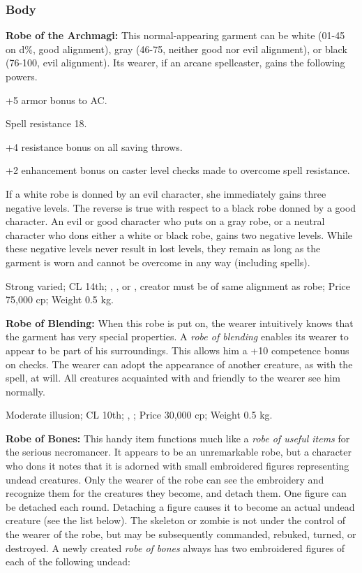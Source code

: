 \subsubsection{Body}

\textbf{Robe of the Archmagi:} This normal-appearing garment can be white (01-45 on d\%, good alignment), gray (46-75, neither good nor evil alignment), or black (76-100, evil alignment). Its wearer, if an arcane spellcaster, gains the following powers.

\begin{itemize*}
\item +5 armor bonus to AC.
\item Spell resistance 18.
\item +4 resistance bonus on all saving throws.
\item +2 enhancement bonus on caster level checks made to overcome spell resistance.
\end{itemize*}

If a white robe is donned by an evil character, she immediately gains three negative levels. The reverse is true with respect to a black robe donned by a good character. An evil or good character who puts on a gray robe, or a neutral character who dons either a white or black robe, gains two negative levels. While these negative levels never result in lost levels, they remain as long as the garment is worn and cannot be overcome in any way (including  spells).

Strong varied; CL 14th; , ,  or , creator must be of same alignment as robe; Price 75,000 cp; Weight 0.5 kg.

\textbf{Robe of Blending:} When this robe is put on, the wearer intuitively knows that the garment has very special properties. A \emph{robe of blending} enables its wearer to appear to be part of his surroundings. This allows him a +10 competence bonus on  checks. The wearer can adopt the appearance of another creature, as with the  spell, at will. All creatures acquainted with and friendly to the wearer see him normally.

Moderate illusion; CL 10th; , ; Price 30,000 cp; Weight 0.5 kg.

\textbf{Robe of Bones:} This handy item functions much like a \emph{robe of useful items} for the serious necromancer. It appears to be an unremarkable robe, but a character who dons it notes that it is adorned with small embroidered figures representing undead creatures. Only the wearer of the robe can see the embroidery and recognize them for the creatures they become, and detach them. One figure can be detached each round. Detaching a figure causes it to become an actual undead creature (see the list below). The skeleton or zombie is not under the control of the wearer of the robe, but may be subsequently commanded, rebuked, turned, or destroyed. A newly created \emph{robe of bones} always has two embroidered figures of each of the following undead:

